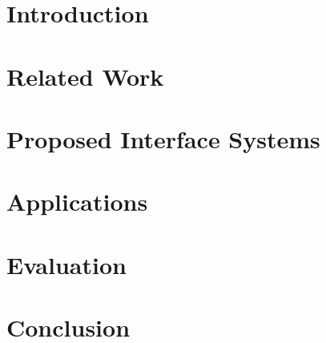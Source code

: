 \newpage
\chapter{Introduction} \label{chapter:Introduction}


\newpage
\chapter{Related Work} \label{chapter:Related Work}


\newpage
\chapter{Proposed Interface Systems} \label{chapter:Proposed Interface System}


\newpage
\chapter{Applications} \label{chapter:Applications}


\newpage
\chapter{Evaluation} \label{chapter:Evaluation}


\newpage
\chapter{Conclusion} \label{chapter:Conclusions}

